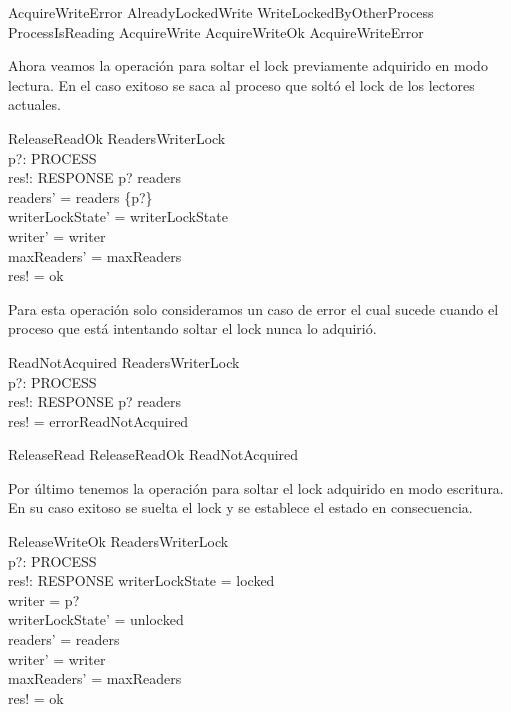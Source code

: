 \documentclass[a4paper, 12pt]{article}
\begin{document}
\begin{zed}
AcquireWriteError  AlreadyLockedWrite \lor WriteLockedByOtherProcess \\ \quad \lor ProcessIsReading 
\also
AcquireWrite  AcquireWriteOk \lor AcquireWriteError 
\end{zed}

Ahora veamos la operación para soltar el lock previamente adquirido en modo lectura. En el caso exitoso se saca al proceso que soltó el lock de los lectores actuales.

\begin{schema}{ReleaseReadOk}
    \Delta ReadersWriterLock \\
    p?: PROCESS \\
    res!: RESPONSE
\where
    p? \in readers \\
    readers' = readers \setminus \{p?\} \\
    writerLockState' = writerLockState \\
    writer' = writer \\
    maxReaders' = maxReaders \\
    res! = ok
\end{schema}

Para esta operación solo consideramos un caso de error el cual sucede cuando el proceso que está intentando soltar el lock nunca lo adquirió.

\begin{schema}{ReadNotAcquired}
    \Xi ReadersWriterLock \\
    p?: PROCESS \\
    res!: RESPONSE
\where
    p? \notin readers \\
    res! = errorReadNotAcquired
\end{schema}

\begin{zed}
ReleaseRead  ReleaseReadOk \lor ReadNotAcquired
\end{zed}

Por último tenemos la operación para soltar el lock adquirido en modo escritura. En su caso exitoso se suelta el lock y se establece el estado en consecuencia.

\begin{schema}{ReleaseWriteOk}
    \Delta ReadersWriterLock \\
    p?: PROCESS \\
    res!: RESPONSE
\where
    writerLockState = locked \\
    writer = p? \\
    writerLockState' = unlocked \\
    readers' = readers \\
    writer' = writer \\
    maxReaders' = maxReaders \\
    res! = ok
\end{schema}
\end{document}
